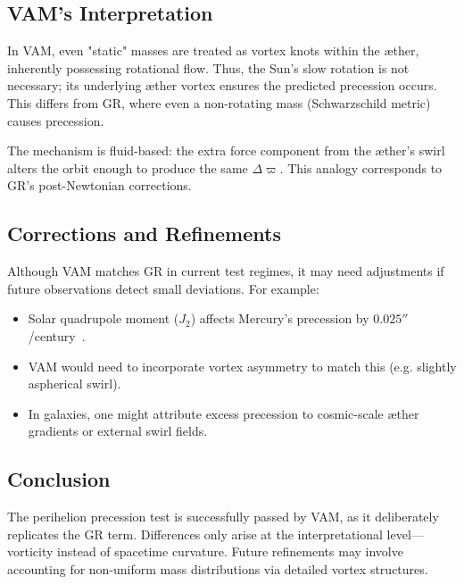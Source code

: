 \subsection*{VAM’s Interpretation}
In VAM, even "static" masses are treated as vortex knots within the æther, inherently possessing rotational flow. Thus, the Sun’s slow rotation is not necessary; its underlying æther vortex ensures the predicted precession occurs. This differs from GR, where even a non-rotating mass (Schwarzschild metric) causes precession.

The mechanism is fluid-based: the extra force component from the æther's swirl alters the orbit enough to produce the same $\Delta \varpi$. This analogy corresponds to GR’s post-Newtonian corrections.

\subsection*{Corrections and Refinements}
Although VAM matches GR in current test regimes, it may need adjustments if future observations detect small deviations. For example:
\begin{itemize}
    \item Solar quadrupole moment ($J_2$) affects Mercury’s precession by $0.025''$/century~\cite{sereno2006solar}.
    \item VAM would need to incorporate vortex asymmetry to match this (e.g. slightly aspherical swirl).
    \item In galaxies, one might attribute excess precession to cosmic-scale æther gradients or external swirl fields.
\end{itemize}

\subsection*{Conclusion}
The perihelion precession test is successfully passed by VAM, as it deliberately replicates the GR term. Differences only arise at the interpretational level—vorticity instead of spacetime curvature. Future refinements may involve accounting for non-uniform mass distributions via detailed vortex structures.